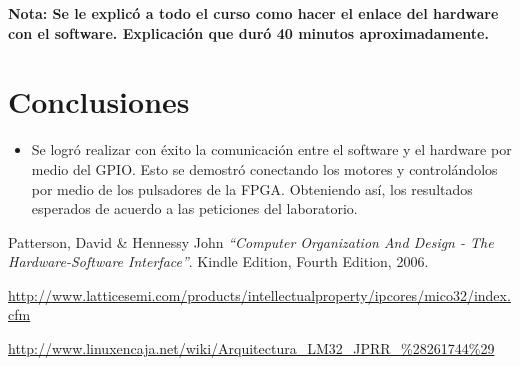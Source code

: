 \documentclass[twocolumn]{IEEEtran}
\begin{document}
{\bf Nota: Se le explicó a todo el curso como hacer el enlace del hardware con el software. Explicación que duró 40 minutos aproximadamente.}

\section{Conclusiones}
\begin{itemize}
\item Se logró realizar con éxito la comunicación entre el software y el hardware por medio del GPIO. Esto se demostró conectando los motores y controlándolos por medio de los pulsadores de la FPGA. Obteniendo así, los resultados esperados de acuerdo a las peticiones del laboratorio.
\end{itemize}


\begin{thebibliography}{99}
 Patterson, David \& Hennessy John
{\em "`Computer Organization And Design - The Hardware-Software Interface"'}.
Kindle Edition, Fourth Edition, 2006.

 \url{http://www.latticesemi.com/products/intellectualproperty/ipcores/mico32/index.cfm}

 \url{http://www.linuxencaja.net/wiki/Arquitectura_LM32_JPRR_\%28261744\%29}
\end{thebibliography}
\end{document}
